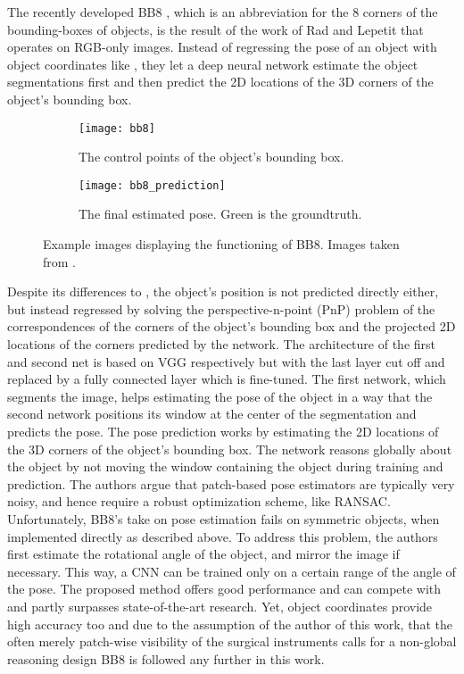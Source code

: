 The recently developed BB8 \cite{bb8}, which is an abbreviation for the 8 corners of the bounding-boxes of objects, is the result of the work of Rad and Lepetit that operates on RGB-only images. Instead of regressing the pose of an object with object coordinates like \cite{brachmann1}, they let a deep neural network estimate the object segmentations first and then predict the 2D locations of the 3D corners of the object's bounding box. 
\nnewline
\begin{figure}[!tbp]
	\centering
	\begin{subfigure}[b]{0.45\textwidth}
		\centering
    	\texttt{[image: bb8]}
    	\caption{The control points of the object's bounding box.}
	\end{subfigure}
	\hfill
	\begin{subfigure}[b]{0.45\textwidth}
		\centering
    	\texttt{[image: bb8\_prediction]}
    	\caption{The final estimated pose. Green is the groundtruth.}
	\end{subfigure}
	\caption{Example images displaying the functioning of BB8. Images taken from \cite{bb8}.}
\end{figure}
Despite its differences to \cite{brachmann1}, the object's position is not predicted directly either, but instead regressed by solving the perspective-n-point (PnP) problem of the correspondences of the corners of the object's bounding box and the projected 2D locations of the corners predicted by the network. The architecture of the first and second net is based on VGG \cite{vgg} respectively but with the last layer cut off and replaced by a fully connected layer which is fine-tuned. 
\nnewline
The first network, which segments the image, helps estimating the pose of the object in a way that the second network positions its window at the center of the segmentation and predicts the pose. The pose prediction works by estimating the 2D locations of the 3D corners of the object's bounding box. The network reasons globally about the object by not moving the window containing the object during training and prediction. The authors argue that patch-based pose estimators are typically very noisy, and hence require a robust optimization scheme, like RANSAC. 
\nnewline
Unfortunately, BB8's take on pose estimation fails on symmetric objects, when implemented directly as described above. To address this problem, the authors first estimate the rotational angle of the object, and mirror the image if necessary. This way, a CNN can be trained only on a certain range of the angle of the pose.
\nnewline
The proposed method offers good performance and can compete with and partly surpasses state-of-the-art research. Yet, object coordinates provide high accuracy too and due to the assumption of the author of this work, that the often merely patch-wise visibility of the surgical instruments calls for a non-global reasoning design BB8 is followed any further in this work.

